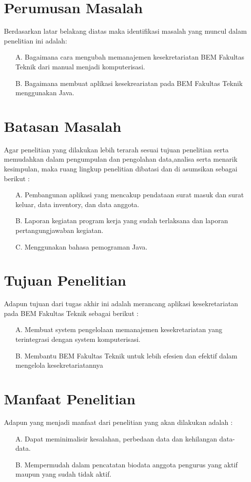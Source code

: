 \documentclass{jtetiproposalskripsi}
\begin{document}
\section{Perumusan Masalah}
Berdasarkan latar belakang diatas maka identifikasi masalah yang muncul dalam penelitian ini adalah:	 
\begin{itemize}
\item[A.] Bagaimana cara mengubah memanajemen kesekretariatan BEM Fakultas Teknik dari manual menjadi komputerisasi.
\item[B.] Bagaimana membuat aplikasi kesekreariatan pada BEM Fakultas Teknik menggunakan Java.
\end{itemize}

\section{Batasan Masalah}

Agar penelitian yang dilakukan lebih terarah sesuai tujuan penelitian serta memudahkan dalam pengumpulan dan pengolahan data,analisa serta menarik kesimpulan, maka ruang lingkup penelitian dibatasi dan di asumsikan sebagai berikut : 
\begin{itemize}
\item[A.] Pembangunan aplikasi yang mencakup pendataan surat masuk dan surat keluar, data inventory, dan data anggota.
\item[B.] Laporan kegiatan program kerja yang sudah terlaksana dan laporan pertangungjawaban kegiatan.
\item[C.] Menggunakan bahasa pemograman Java.
\end{itemize}

\section{Tujuan Penelitian}
Adapun tujuan dari tugas akhir ini adalah merancang aplikasi kesekretariatan pada BEM Fakultas Teknik sebagai berikut :
\begin{itemize}
\item[A.] Membuat system pengelolaan memanajemen kesekretariatan yang terintegrasi dengan system komputerisasi.
\item[B.] Membantu BEM Fakultas Teknik untuk lebih efesien dan efektif dalam mengelola kesekretariatannya
\end{itemize}


\section{Manfaat Penelitian}
Adapun yang menjadi manfaat dari penelitian yang akan dilakukan adalah :
\begin{itemize}
\item[A.] Dapat meminimalisir kesalahan, perbedaan data dan kehilangan data-data.
\item[B.] Mempermudah dalam pencatatan biodata anggota pengurus yang aktif maupun yang sudah tidak aktif.
\end{itemize}
\end{document}
